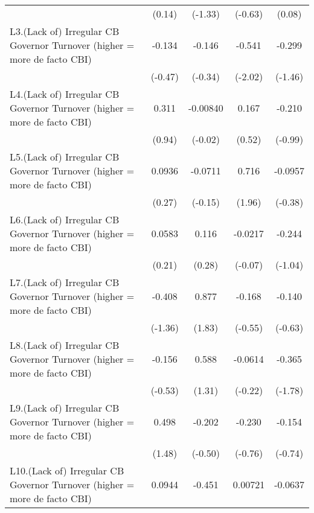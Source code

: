 {\begin{longtable}{l*{4}{c}}
                &   (0.14)         &  (-1.33)         &  (-0.63)         &   (0.08)         \\
\addlinespace
L3.(Lack of) Irregular CB Governor Turnover (higher = more de facto CBI)&   -0.134         &   -0.146         &   -0.541\sym{*}  &   -0.299         \\
                &  (-0.47)         &  (-0.34)         &  (-2.02)         &  (-1.46)         \\
\addlinespace
L4.(Lack of) Irregular CB Governor Turnover (higher = more de facto CBI)&    0.311         & -0.00840         &    0.167         &   -0.210         \\
                &   (0.94)         &  (-0.02)         &   (0.52)         &  (-0.99)         \\
\addlinespace
L5.(Lack of) Irregular CB Governor Turnover (higher = more de facto CBI)&   0.0936         &  -0.0711         &    0.716         &  -0.0957         \\
                &   (0.27)         &  (-0.15)         &   (1.96)         &  (-0.38)         \\
\addlinespace
L6.(Lack of) Irregular CB Governor Turnover (higher = more de facto CBI)&   0.0583         &    0.116         &  -0.0217         &   -0.244         \\
                &   (0.21)         &   (0.28)         &  (-0.07)         &  (-1.04)         \\
\addlinespace
L7.(Lack of) Irregular CB Governor Turnover (higher = more de facto CBI)&   -0.408         &    0.877         &   -0.168         &   -0.140         \\
                &  (-1.36)         &   (1.83)         &  (-0.55)         &  (-0.63)         \\
\addlinespace
L8.(Lack of) Irregular CB Governor Turnover (higher = more de facto CBI)&   -0.156         &    0.588         &  -0.0614         &   -0.365         \\
                &  (-0.53)         &   (1.31)         &  (-0.22)         &  (-1.78)         \\
\addlinespace
L9.(Lack of) Irregular CB Governor Turnover (higher = more de facto CBI)&    0.498         &   -0.202         &   -0.230         &   -0.154         \\
                &   (1.48)         &  (-0.50)         &  (-0.76)         &  (-0.74)         \\
\addlinespace
L10.(Lack of) Irregular CB Governor Turnover (higher = more de facto CBI)&   0.0944         &   -0.451         &  0.00721         &  -0.0637         \\

\end{longtable}}
